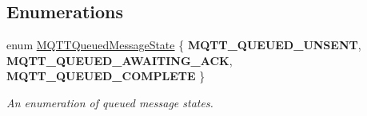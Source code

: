 \subsection*{Enumerations}
\begin{DoxyCompactItemize}
\item 
enum \hyperlink{group__details_ga28b018ca5d1c81101d36f9c0d532a0d0}{M\+Q\+T\+T\+Queued\+Message\+State} \{ {\bfseries M\+Q\+T\+T\+\_\+\+Q\+U\+E\+U\+E\+D\+\_\+\+U\+N\+S\+E\+NT}, 
{\bfseries M\+Q\+T\+T\+\_\+\+Q\+U\+E\+U\+E\+D\+\_\+\+A\+W\+A\+I\+T\+I\+N\+G\+\_\+\+A\+CK}, 
{\bfseries M\+Q\+T\+T\+\_\+\+Q\+U\+E\+U\+E\+D\+\_\+\+C\+O\+M\+P\+L\+E\+TE}
 \}\hypertarget{group__details_ga28b018ca5d1c81101d36f9c0d532a0d0}{}\label{group__details_ga28b018ca5d1c81101d36f9c0d532a0d0}
\begin{DoxyCompactList}\small\item\em An enumeration of queued message states. \end{DoxyCompactList}
\end{DoxyCompactItemize}
